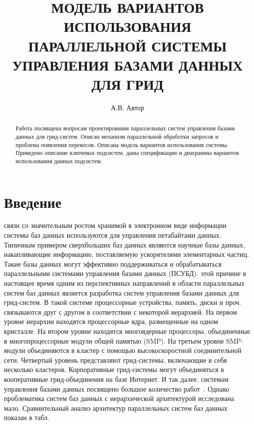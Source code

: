 \documentclass[11pt,oneside]{article}
\begin{document}
	
	\newcommand{\phan}{\hspace*{0cm}}
	\newcommand{\comment}{}
	\author{А.В. Автор}
	\title{МОДЕЛЬ ВАРИАНТОВ ИСПОЛЬЗОВАНИЯ ПАРАЛЛЕЛЬНОЙ СИСТЕМЫ УПРАВЛЕНИЯ БАЗАМИ ДАННЫХ ДЛЯ ГРИД}
	\maketitle{}
	\begin{abstract}
		Работа посвящена вопросам проектирования параллельных систем управления базами данных для грид-систем. Описан механизм параллельной обработки запросов и проблема появления перекосов. Описана модель вариантов использования системы. Приведено описание ключевых подсистем, даны спецификации и диаграммы вариантов использования данных подсистем.
	\end{abstract}
	
	
	
	\section*{Введение}
	 связи со значительным ростом хранимой в электронном виде информации системы баз данных используются для управления петабайтами данных. Типичным примером сверхбольших баз данных являются научные базы данных, накапливающие информацию, поставляемую ускорителями элементарных частиц. Такие базы данных могут эффективно поддерживаться и обрабатываться параллельными системами управления базами данных (ПСУБД).
	 этой причине в настоящее время одним из перспективных направлений в области параллельных систем баз данных является разработка систем управления базами данных для грид-систем. В такой системе процессорные устройства, память, диски и проч. связываются друг с другом в соответствии с некоторой иерархией. На первом уровне иерархии находятся процессорные ядра, размещенные на одном кристалле. На втором уровне находятся многоядерные процессоры, объединенные в многопроцессорные модули общей памятью (SMP). На третьем уровне SMP-модули объединяются в кластер с помощью высокоскоростной соединительной сети. Четвертый уровень представляют грид-системы, включающие в себя несколько кластеров. Корпоративные грид-системы могут объединяться в кооперативные грид-объединения на базе Интернет. И так далее.
	 системам управления базами данных посвящено большое количество работ~\cite{B_Gray2005, B_Mehta1997, B_Williams1998}. Однако проблематика систем баз данных с иерархической архитектурой исследована мало. Сравнительный анализ архитектур параллельных систем баз данных показан в табл. %
	
\end{document}
